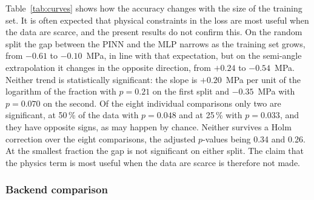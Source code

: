 \documentclass[subscriptcorrection,upint,varvw,barcolor=Goldenrod3,mathalfa=cal=euler,balance,hyphenate,french,pdf-a]{asmejour} %
\begin{document}
Table~\ref{tab:curves} shows how the accuracy changes with the size of the training set. It is often expected that physical constraints in the loss are most useful when the data are scarce, and the present results do not confirm this. On the random split the gap between the PINN and the MLP narrows as the training set grows, from $-0.61$ to $-0.10$~MPa, in line with that expectation, but on the semi-angle extrapolation it changes in the opposite direction, from $+0.24$ to $-0.54$~MPa. Neither trend is statistically significant: the slope is $+0.20$~MPa per unit of the logarithm of the fraction with $p=0.21$ on the first split and $-0.35$~MPa with $p=0.070$ on the second. Of the eight individual comparisons only two are significant, at 50\,\% of the data with $p=0.048$ and at 25\,\% with $p=0.033$, and they have opposite signs, as may happen by chance. Neither survives a Holm correction over the eight comparisons, the adjusted $p$-values being 0.34 and 0.26. At the smallest fraction the gap is not significant on either split. The claim that the physics term is most useful when the data are scarce is therefore not made.

\subsubsection{Backend comparison}
\label{sec:res_backend}
\end{document}
